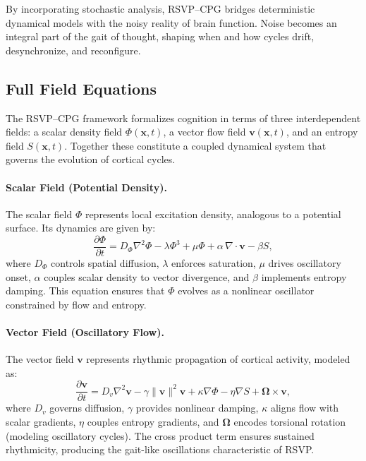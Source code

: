 \documentclass{article}
\begin{document}
By incorporating stochastic analysis, RSVP--CPG bridges deterministic dynamical models with the noisy reality of brain function. Noise becomes an integral part of the gait of thought, shaping when and how cycles drift, desynchronize, and reconfigure.

\subsection{Full Field Equations}

The RSVP--CPG framework formalizes cognition in terms of three interdependent fields: a scalar density field $\Phi(\mathbf{x},t)$, a vector flow field $\mathbf{v}(\mathbf{x},t)$, and an entropy field $S(\mathbf{x},t)$. Together these constitute a coupled dynamical system that governs the evolution of cortical cycles.

\paragraph{Scalar Field (Potential Density).}  
The scalar field $\Phi$ represents local excitation density, analogous to a potential surface. Its dynamics are given by:
\begin{equation}
\frac{\partial \Phi}{\partial t} = D_\Phi \nabla^2 \Phi - \lambda \Phi^3 + \mu \Phi + \alpha \, \nabla \cdot \mathbf{v} - \beta S,
\end{equation}
where $D_\Phi$ controls spatial diffusion, $\lambda$ enforces saturation, $\mu$ drives oscillatory onset, $\alpha$ couples scalar density to vector divergence, and $\beta$ implements entropy damping. This equation ensures that $\Phi$ evolves as a nonlinear oscillator constrained by flow and entropy.

\paragraph{Vector Field (Oscillatory Flow).}  
The vector field $\mathbf{v}$ represents rhythmic propagation of cortical activity, modeled as:
\begin{equation}
\frac{\partial \mathbf{v}}{\partial t} = D_v \nabla^2 \mathbf{v} - \gamma \|\mathbf{v}\|^2 \mathbf{v} + \kappa \nabla \Phi - \eta \nabla S + \mathbf{\Omega} \times \mathbf{v},
\end{equation}
where $D_v$ governs diffusion, $\gamma$ provides nonlinear damping, $\kappa$ aligns flow with scalar gradients, $\eta$ couples entropy gradients, and $\mathbf{\Omega}$ encodes torsional rotation (modeling oscillatory cycles). The cross product term ensures sustained rhythmicity, producing the gait-like oscillations characteristic of RSVP.
\end{document}
